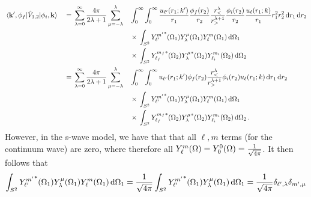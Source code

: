 \documentclass{article}
\begin{document}
\begin{alignat*}{3}
  &
  \mel{\vb{k}', \phi_{f}}{\hat{V}_{1, 2}}{\phi_{i}, \vb{k}}
  &{}={}&
  \sum_{\lambda = 0}^{\infty}
  \dfrac{4\pi}{2\lambda + 1}
  \sum_{\mu = -\lambda}^{\lambda}
  &&
  \int_{0}^{\infty}
  \int_{0}^{\infty}
  {
    \dfrac{u_{\ell'}(r_{1}; k')}{r_{1}}
    \dfrac{\phi_{f}(r_{2})}{r_{2}}
    \dfrac{r_{<}^{\lambda}}{r_{>}^{\lambda + 1}}
    \dfrac{\phi_{i}(r_{2})}{r_{2}}
    \dfrac{u_{\ell}(r_{1}; k)}{r_{1}}
  }
  r_{1}^{2}
  r_{2}^{2}
  \dd{r_{1}}
  \dd{r_{2}}
  \\
  &
  {}
  &&
  {}
  &&
  {}\times{}
  \int_{S^{2}}
  {
    {Y_{\ell'}^{m'}}^{*}(\Omega_{1})
    Y_{\lambda}^{\mu}(\Omega_{1})
    Y_{\ell}^{m}(\Omega_{1})
  }
  \dd{\Omega_{1}}
  \\
  &
  {}
  &&
  {}
  &&
  {}\times{}
  \int_{S^{2}}
  {
    {Y_{\ell_{f}}^{m_{f}}}^{*}(\Omega_{2})
    {Y_{\lambda}^{\mu}}^{*}(\Omega_{2})
    Y_{\ell_{i}}^{m_{i}}(\Omega_{2})
  }
  \dd{\Omega_{2}}
  \\
  &
  {}
  &{}={}&
  \sum_{\lambda = 0}^{\infty}
  \dfrac{4\pi}{2\lambda + 1}
  \sum_{\mu = -\lambda}^{\lambda}
  &&
  \int_{0}^{\infty}
  \int_{0}^{\infty}
  {
    u_{\ell'}(r_{1}; k')
    \phi_{f}(r_{2})
    \dfrac{r_{<}^{\lambda}}{r_{>}^{\lambda + 1}}
    \phi_{i}(r_{2})
    u_{\ell}(r_{1}; k)
  }
  \dd{r_{1}}
  \dd{r_{2}}
  \\
  &
  {}
  &&
  {}
  &&
  {}\times{}
  \int_{S^{2}}
  {
    {Y_{\ell'}^{m'}}^{*}(\Omega_{1})
    Y_{\lambda}^{\mu}(\Omega_{1})
    Y_{\ell}^{m}(\Omega_{1})
  }
  \dd{\Omega_{1}}
  \\
  &
  {}
  &&
  {}
  &&
  {}\times{}
  \int_{S^{2}}
  {
    {Y_{\ell_{f}}^{m_{f}}}^{*}(\Omega_{2})
    {Y_{\lambda}^{\mu}}^{*}(\Omega_{2})
    Y_{\ell_{i}}^{m_{i}}(\Omega_{2})
  }
  \dd{\Omega_{2}}
  .
\end{alignat*}
However, in the s-wave model, we have that that all $\ell, m$ terms (for the
continuum wave) are zero, where therefore all
$Y_{\ell}^{m}(\Omega) = Y_{0}^{0}(\Omega) = \tfrac{1}{\sqrt{4\pi}}$.
It then follows that
\begin{equation*}
  \int_{S^{2}}
  {
    {Y_{\ell'}^{m'}}^{*}(\Omega_{1})
    Y_{\lambda}^{\mu}(\Omega_{1})
    Y_{\ell}^{m}(\Omega_{1})
  }
  \dd{\Omega_{1}}
  =
  \dfrac{1}{\sqrt{4 \pi}}
  \int_{S^{2}}
  {
    {Y_{\ell'}^{m'}}^{*}(\Omega_{1})
    Y_{\lambda}^{\mu}(\Omega_{1})
  }
  \dd{\Omega_{1}}
  =
  \dfrac{1}{\sqrt{4 \pi}}
  \delta_{\ell', \lambda}
  \delta_{m', \mu}
\end{equation*}
\end{document}
